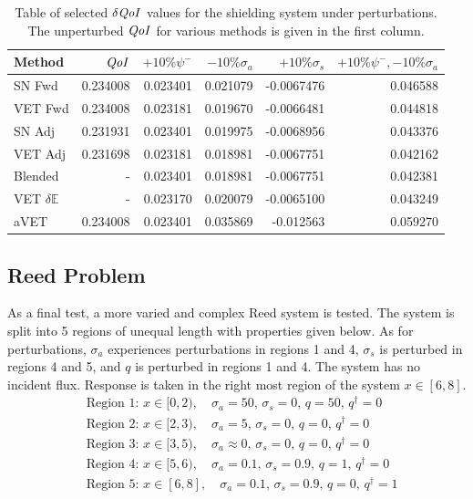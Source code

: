 \documentclass[12pt]{report}
\newcommand{\Edd}{\mathbb{E}}
\newcommand{\sigs}{\sigma_s}
\newcommand{\siga}{\sigma_a}
\newcommand{\qoi}{{\it QoI}\xspace}
\begin{document}
\begin{table}[H]
\centering
  \begin{tabular}{| l | r || r | r | r | r |}
    \hline
    Method  & $\qoi$ & $+10\% \psi^- $  & $-10\% \siga $ & $+10\% \sigs $ & $+10\% \psi^-,-10\% \siga$ \\ \hline
     SN Fwd 			&0.234008 	&0.023401 &0.021079 &-0.0067476 & 0.046588\\ \hline
     VET Fwd			&0.234008 	&0.023181 &0.019670 &-0.0066481 &0.044818\\ \hline
     SN Adj  			&0.231931 	&0.023401 &0.019975 &-0.0068956 &0.043376\\ \hline
     VET Adj 			&0.231698 	&0.023181 &0.018981 &-0.0067751 &0.042162\\ \hline
     Blended 			&-			&0.023401 &0.018981 &-0.0067751 &0.042381\\ \hline
     VET $\delta \Edd$ 	&-			&0.023170 &0.020079 &-0.0065100 &0.043249\\ \hline
     aVET				&0.234008 	&0.023401 &0.035869 &-0.012563	&0.059270\\ \hline
    \end{tabular}
  \caption{Table of selected $\delta \qoi$ values for the shielding system under perturbations. The unperturbed $\qoi$ for various methods is given in the first column.}
  \label{TableT3}
\end{table}

\subsection{Reed Problem}
As a final test, a more varied and complex Reed system\cite{buchan} is tested. The system is split into 5 regions of unequal length with properties given below. As for perturbations, $\siga$ experiences perturbations in regions 1 and 4, $\sigs$ is perturbed in regions 4 and 5, and $q$ is perturbed in regions 1 and 4. The system has no incident flux. Response is taken in the right most region of the system $x \in [6,8]$.
\begin{equation*}
\begin{split}
&\text{Region 1: } x \in [0,2), \quad \siga=50, \, 			\sigs=0, \, q=50, \, q^\dag=0 \\
&\text{Region 2: } x \in [2,3), \quad \siga=5, \, 			\sigs=0, \, q=0, \, q^\dag=0 \\
&\text{Region 3: } x \in [3,5), \quad \siga \approx 0, \,	\sigs=0, \, q=0, \, q^\dag=0 \\
&\text{Region 4: } x \in [5,6), \quad \siga=0.1, \, 		\sigs=0.9, \, q=1, \, q^\dag=0 \\
&\text{Region 5: } x \in [6,8], \quad \siga=0.1, \, 		\sigs=0.9, \, q=0, \, q^\dag=1 \\
\end{split}
\end{equation*}
\end{document}
